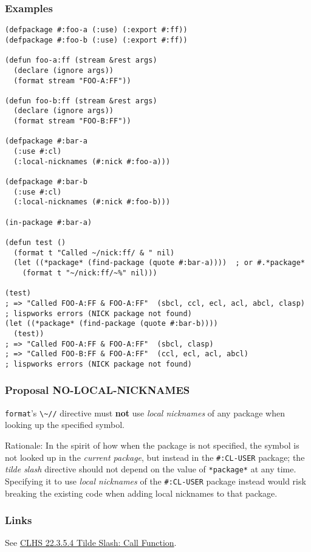 \documentclass[11pt]{article}
\begin{document}
\subsubsection{Examples}
\label{sec:orgcbdcb8c}
\begin{verbatim}
(defpackage #:foo-a (:use) (:export #:ff))
(defpackage #:foo-b (:use) (:export #:ff))

(defun foo-a:ff (stream &rest args)
  (declare (ignore args))
  (format stream "FOO-A:FF"))

(defun foo-b:ff (stream &rest args)
  (declare (ignore args))
  (format stream "FOO-B:FF"))

(defpackage #:bar-a
  (:use #:cl)
  (:local-nicknames (#:nick #:foo-a)))

(defpackage #:bar-b
  (:use #:cl)
  (:local-nicknames (#:nick #:foo-b)))

(in-package #:bar-a)

(defun test ()
  (format t "Called ~/nick:ff/ & " nil)
  (let ((*package* (find-package (quote #:bar-a))))  ; or #.*package*
    (format t "~/nick:ff/~%" nil)))

(test)
; => "Called FOO-A:FF & FOO-A:FF"  (sbcl, ccl, ecl, acl, abcl, clasp)
; lispworks errors (NICK package not found)
(let ((*package* (find-package (quote #:bar-b))))
  (test))
; => "Called FOO-A:FF & FOO-A:FF"  (sbcl, clasp)
; => "Called FOO-B:FF & FOO-A:FF"  (ccl, ecl, acl, abcl)
; lispworks errors (NICK package not found)
\end{verbatim}
\subsubsection{Proposal NO-LOCAL-NICKNAMES}
\label{sec:org6690547}
\texttt{format}'s \texttt{\textbackslash{}\textasciitilde{}//} directive must \textbf{not} use \emph{local nicknames} of any package when
looking up the specified symbol.

Rationale: In the spirit of how when the package is not specified, the symbol is
not looked up in the \emph{current package}, but instead in the \texttt{\#:CL-USER} package;
the \emph{tilde slash} directive should not depend on the value of \texttt{*package*} at any
time.  Specifying it to use \emph{local nicknames} of the \texttt{\#:CL-USER} package instead
would risk breaking the existing code when adding local nicknames to that package.
\subsubsection{Links}
\label{sec:org7b64f3c}
See \href{https://www.lispworks.com/documentation/HyperSpec/Body/22\_ced.htm}{CLHS 22.3.5.4 Tilde Slash: Call Function}.
\end{document}
